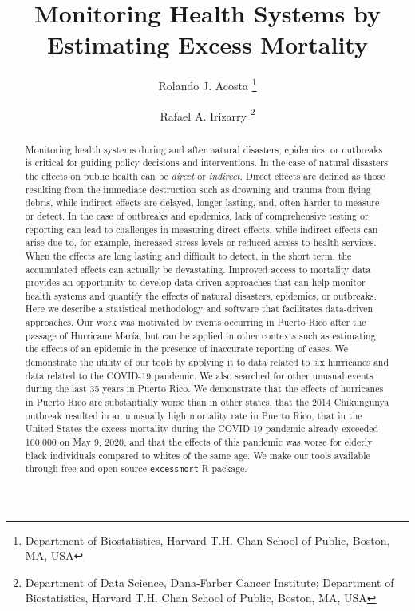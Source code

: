 \documentclass[11pt]{article}
\begin{document}
\title{Monitoring Health Systems by Estimating Excess Mortality}
 
\author{
{Rolando J. Acosta \footnote{Department of Biostatistics, Harvard T.H. Chan School of Public, Boston, MA, USA}} \and {Rafael A. Irizarry \footnote{Department of Data Science, Dana-Farber Cancer Institute; \newline Department of Biostatistics, Harvard T.H. Chan School of Public, Boston, MA, USA}}
}

\maketitle
\setcounter{page}{0}

\begin{abstract}
Monitoring health systems during and after natural disasters, epidemics, or outbreaks is critical for guiding policy decisions and interventions. In the case of natural disasters the effects on public health can be \textit{direct} or \textit{indirect}. Direct effects are defined as those resulting from the immediate destruction such as drowning and trauma from flying debris, while indirect effects are delayed, longer lasting, and, often harder to measure or detect. In the case of outbreaks and epidemics, lack of comprehensive testing or reporting can lead to challenges in measuring direct effects, while indirect effects can arise due to, for example, increased stress levels or reduced access to health services. When the effects are long lasting and difficult to detect, in the short term, the accumulated effects can actually be devastating. Improved access to mortality data provides an opportunity to develop data-driven approaches that can help monitor health systems and quantify the effects of natural disasters, epidemics, or outbreaks. Here we describe a statistical methodology and software that facilitates data-driven approaches. Our work was motivated by events occurring in Puerto Rico after the passage of Hurricane Mar\'ia, but can be applied in other contexts such as estimating the effects of an epidemic in the presence of inaccurate reporting of cases. We demonstrate the utility of our tools by applying it to data related to six hurricanes and data related to the COVID-19 pandemic. We also searched for other unusual events during the last 35 years in Puerto Rico. We demonstrate that the effects of hurricanes in Puerto Rico are substantially worse than in other states, that the 2014 Chikungunya outbreak resulted in an unusually high mortality rate in Puerto Rico, that in the United States the excess mortality during the COVID-19 pandemic already exceeded 100,000 on May 9, 2020, and that the effects of this pandemic was worse for elderly black individuals compared to whites of the same age. We make our tools available through free and open source \verb+excessmort+ R package.
\end{abstract}
\end{document}

